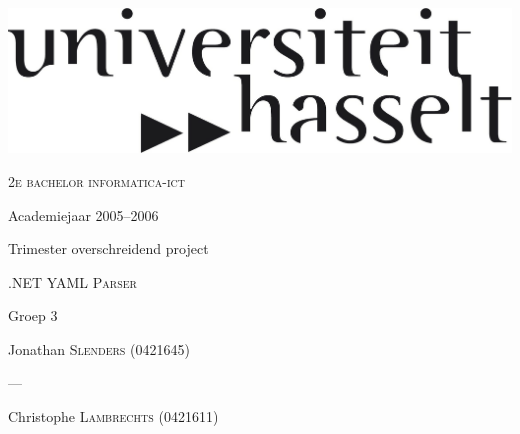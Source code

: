 
\begin{titlepage}

\fontsize{12pt}{14pt}\selectfont

\begin{center}

\includegraphics[width=1\textwidth]{logoUH.png}

\vspace{1cm}

\fontsize{14pt}{17pt}\selectfont
\textsc{2e bachelor informatica-ict}
\fontsize{12pt}{14pt}\selectfont
\vspace{0.3cm}

\vspace{1.2cm}

Academiejaar 2005--2006

\vspace{2.8cm}

\fontsize{17.28pt}{21pt}\selectfont

Trimester overschreidend project



\textsc{.NET YAML Parser}

\fontsize{12pt}{14pt}\selectfont

\vspace{3cm}

Groep 3

\vspace{1.6cm}

Jonathan \textsc{Slenders} (0421645)


---


Christophe \textsc{Lambrechts} (0421611)

\vspace{2cm}

\end{center}
\end{titlepage}

\thispagestyle{empty}
